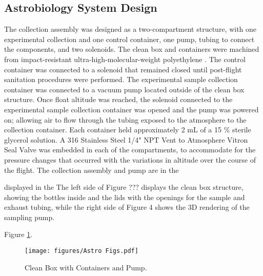 \subsection{Astrobiology System Design}
\label{sec:Astrobiology Design}
The collection assembly was designed as a two-compartment structure, with one experimental collection and one control container, one pump, tubing to connect the components, and two solenoids. The clean box and containers were machined from impact-resistant ultra-high-molecular-weight polyethylene \cite{cleanbox}. The control container was connected to a solenoid that remained closed until post-flight sanitation procedures were performed. The experimental sample collection container was connected to a vacuum pump located outside of the clean box structure. Once float altitude was reached, the solenoid connected to the experimental sample collection container was opened and the pump was powered on; allowing air to flow through the tubing exposed to the atmosphere to the collection container. Each container held approximately 2 mL of a 15 \% sterile glycerol solution. A 316 Stainless Steel 1/4" NPT Vent to Atmosphere Vitron Seal Valve was embedded in each of the compartments, to accommodate for the pressure changes that occurred with the variations in altitude over the course of the flight. The collection assembly and pump are in the 

displayed in the The left side of Figure ??? displays the clean box structure, showing the bottles inside and the lids with the openings for the sample and exhaust tubing, while the right side of Figure 4 shows the 3D rendering of the sampling pump.

Figure \ref{fig:Astro System}.


\begin{figure}[H]
	\begin{center}
		\texttt{[image: figures/Astro Figs.pdf]}
		\caption{Clean Box with Containers and Pump.}
		\label{fig:Astro System}
	\end{center}
\end{figure}